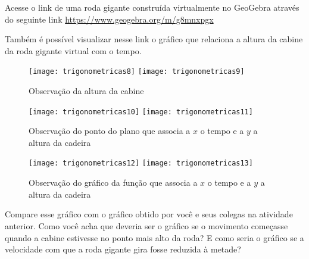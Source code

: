 \begin{reflection}
Acesse o link de uma roda gigante construída virtualmente no GeoGebra através do seguinte link \url{https://www.geogebra.org/m/g8mnxpgx}

Também é possível visualizar nesse link o gráfico que relaciona a altura da cabine da roda gigante virtual com o tempo.

\begin{figure}[H]
\centering

\texttt{[image: trigonometricas8]}
\texttt{[image: trigonometricas9]}
\caption{Observação da altura da cabine}

\end{figure}

\begin{figure}[H]
\centering

\texttt{[image: trigonometricas10]}
\texttt{[image: trigonometricas11]}
\caption{Observação do ponto do plano que associa a $x$ o tempo e a $y$ a altura da cadeira}
\end{figure}

\begin{figure}[H]
\centering

\texttt{[image: trigonometricas12]}
\texttt{[image: trigonometricas13]}
\caption{Observação do gráfico da função que associa a $x$ o tempo e a $y$ a altura da cadeira}
\end{figure}

Compare esse gráfico com o gráfico obtido por você e seus colegas na atividade anterior. Como você acha que deveria ser o gráfico se o movimento começasse quando a cabine estivesse no ponto mais alto da roda? E como seria o gráfico se a velocidade com que a roda gigante gira fosse reduzida à metade?
\end{reflection}

\label{trig-arg1}

